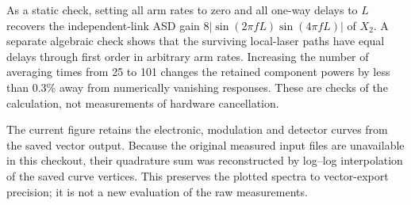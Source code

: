 As a static check, setting all arm rates to zero and all one-way delays to $L$ recovers the independent-link ASD gain $8|\sin(2\pi fL)\sin(4\pi fL)|$ of $X_2$. A separate algebraic check shows that the surviving local-laser paths have equal delays through first order in arbitrary arm rates. Increasing the number of averaging times from 25 to 101 changes the retained component powers by less than 0.3\% away from numerically vanishing responses. These are checks of the calculation, not measurements of hardware cancellation.

The current figure retains the electronic, modulation and detector curves from the saved vector output. Because the original measured input files are unavailable in this checkout, their quadrature sum was reconstructed by log--log interpolation of the saved curve vertices. This preserves the plotted spectra to vector-export precision; it is not a new evaluation of the raw measurements.
